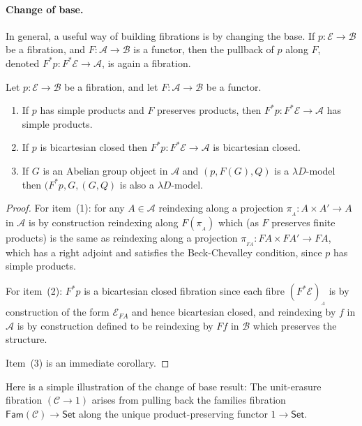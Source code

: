 \documentclass[a4paper,UKenglish]{lipics}
\newcommand{\ra}{\rightarrow}
\newcommand{\msf}[1]{\mathsf{#1}} %
\newcommand{\Set}{\msf{Set}}
\newcommand{\Fam}[1]{\msf{Fam}(#1)}
\newcommand{\A}{\mathcal{A}}
\newcommand{\B}{\mathcal{B}}
\newcommand{\C}{\mathcal{C}}
\newcommand{\E}{\mathcal{E}}
\newcommand{\fibre}[2]{#1_{_{#2}}}
\newcommand{\fibreE}[1]{\E_{#1}}
\begin{document}
\paragraph*{Change of base.}
\label{sec:change-of-base}
In general, a useful way of building fibrations is by changing the base.
If $p:\E\ra \B$ be a fibration,
and $F:\A\ra \B$ is a functor,
then the pullback of $p$ along $F$,
denoted
$F^\ast p : F^\ast \E \rightarrow \A$,
is again a fibration.
\begin{theorem}
\label{thm:change-of-base}
Let $p:\E\ra \B$ be a fibration,
and let $F:\A\ra \B$ be a functor.
\begin{enumerate}
\item If $p$ has simple products and $F$ preserves products,
then $F^\ast p : F^\ast \E \rightarrow \A$ has simple products.
\item If $p$ is bicartesian closed then $F^\ast p: F^\ast \E \rightarrow \A$
is bicartesian closed.
\item If $G$ is an Abelian group object in $\A$ and
  $(p,F(G),Q)$ is a $\lambda D$-model
  then $(F^\ast p,G,(G,Q)$ is also a $\lambda D$-model.
\end{enumerate}
\end{theorem}
\begin{proof}
For item~(1): for any $A \in \A$ reindexing along a projection $\pi_{_{A}}: A \times A' \rightarrow A$ in $\A$ is by construction reindexing along $F(\pi_{_{A}})$ which (as $F$ preserves finite products) is the same as reindexing along a projection $\pi_{_{FA}} : FA \times FA' \rightarrow FA$, which has a right adjoint and satisfies the Beck-Chevalley condition, since $p$ has simple products.

For item~(2): $F^*p$ is a bicartesian closed fibration since each fibre $\fibre{(F^*\E)}{A}$ is by construction of the form $\fibreE{FA}$ and hence bicartesian closed, and reindexing by $f$ in $\A$ is by construction defined to be reindexing by $Ff$ in $\B$ which preserves the structure.

Item~(3) is an immediate corollary.
\end{proof}


Here is a simple illustration of the change of base result:
The unit-erasure fibration $(\C\to 1)$ arises from pulling back the families fibration
$\Fam\C\to\Set$ along the unique product-preserving functor $1\to\Set$.
\end{document}
